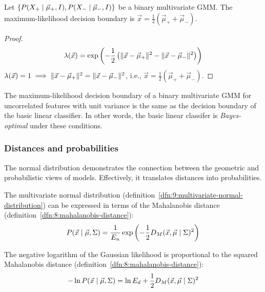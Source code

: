 \begin{proposition}
  Let $\{ P(X_+ \mid \vec{\mu}_+, I), P(X_- \mid \vec{\mu}_-, I) \}$
  be a binary multivariate GMM.
  The maximum-likelihood decision boundary is
  $\vec{x} = \frac{1}{2}(\vec{\mu}_+ + \vec{\mu}_-)$.
  \begin{proof}
    \begin{equation*}
      \lambda(\vec{x}) = \exp \left(-\frac{1}{2}\left(
        \lVert \vec{x} - \vec{\mu}_+ \rVert^2 - \lVert \vec{x} - \vec{\mu}_- \rVert^2
        \right)\right)
    \end{equation*}
    $\lambda(\vec{x}) = 1 \implies \lVert \vec{x} - \vec{\mu}_+ \rVert^2 = \lVert \vec{x} - \vec{\mu}_- \rVert^2$,
    i.e., $\vec{x} = \frac{1}{2}(\vec{\mu}_+ + \vec{\mu}_-)$.
  \end{proof}
\end{proposition}

The maximum-likelihood decision boundary of a binary multivariate GMM for
uncorrelated features with unit variance is the same as the decision boundary of
the basic linear classifier.
In other words, the basic linear classifer is \textit{Bayes-optimal} under these
conditions.

\subsubsection{Distances and probabilities}

The normal distribution demonstrates the connection between the geometric and
probabilistic views of models.
Effectively, it translates distances into probabilities.

\begin{dfn}
  \label{dfn:9:normal-mahalanobis}
  The multivariate normal distribution
  (definition~\ref{dfn:9:multivariate-normal-distribution})
  can be expressed in terms of the Mahalanobis distance
  (definition~\ref{dfn:8:mahalanobis-distance}):
  \begin{equation}
    P(\vec{x} \mid \vec{\mu}, \Sigma)
    = \frac{1}{E_n} \exp \left(
    -\frac{1}{2} D_M (\vec{x}, \vec{\mu} \mid \Sigma)^2
    \right)
  \end{equation}
\end{dfn}

\begin{dfn}
  \label{dfn:9:normal-log-likelihood}
  The negative logarithm of the Gaussian likelihood is proportional to the
  squared Mahalanobis distance (definition~\ref{dfn:8:mahalanobis-distance}):
  \begin{equation}
    - \ln P(\vec{x} \mid \vec{\mu}, \Sigma)
    = \ln E_d + \frac{1}{2} D_M (\vec{x}, \vec{\mu} \mid \Sigma)^2
  \end{equation}
\end{dfn}

